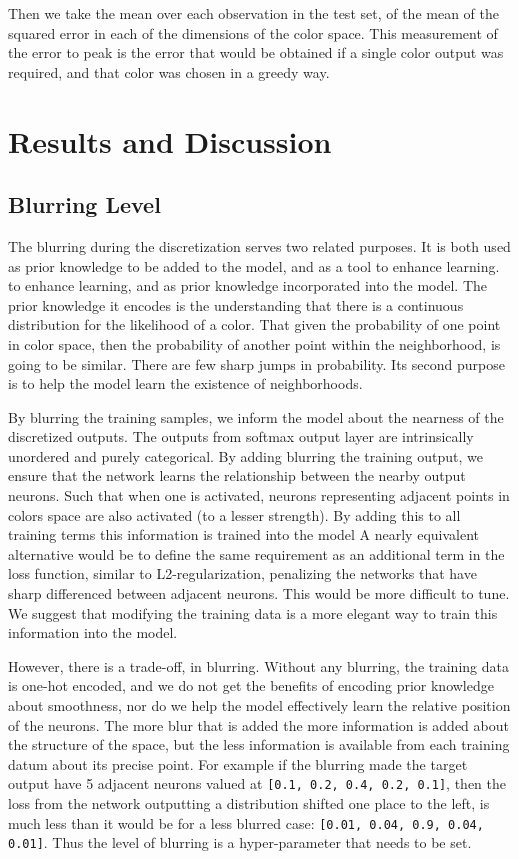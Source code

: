 \documentclass[11pt,letterpaper]{article}
\begin{document}
Then we take the mean over each observation in the test set, of the mean of the squared error in each of the dimensions of the color space.
This measurement of the error to peak is the error that would be obtained if a single color output was required, and that color was chosen in a greedy way.



\section{Results and Discussion}

\subsection{Blurring Level}
The blurring during the discretization serves two related purposes.
It is both used as prior knowledge to be added to the model, and as a tool to enhance learning.
to enhance learning, and as prior knowledge incorporated into the model. 
The prior knowledge it encodes is the understanding that there is a continuous distribution for the likelihood of a color.
That given the probability of one point in color space, then the probability of another point within the neighborhood, is going to be similar.
There are few sharp jumps in probability.
Its second purpose is to help the model learn the existence of neighborhoods.

By blurring the training samples, we inform the model about the nearness of the discretized outputs.
The outputs from softmax output layer are intrinsically unordered and purely categorical.
By adding blurring the training output, we ensure that the network learns the relationship between the nearby output neurons.
Such that when one is activated, neurons representing  adjacent points in colors space are also activated (to a lesser strength).
By adding this to all training terms this information is trained into the model
A nearly equivalent alternative would be to define the same requirement as an additional term in the loss function, similar to L2-regularization, penalizing the networks that have sharp differenced between adjacent neurons.
This would be more difficult to tune.
We suggest that modifying the training data is a more elegant way to train this information into the model.

However, there is a trade-off, in blurring.
Without any blurring, the training data is one-hot encoded, and we do not get the benefits of encoding prior knowledge about smoothness, nor do we help the model effectively learn the relative position of the neurons.
The more blur that is added the more information is added about the structure of the space,
but the less information is available from each training datum about its precise point.
For example if the blurring made the target output have 5 adjacent neurons valued at \texttt{[0.1, 0.2, 0.4, 0.2, 0.1]}, then the loss from the network outputting a distribution shifted one place to the left, is much less than it would be for a less blurred case: \texttt{[0.01, 0.04, 0.9, 0.04, 0.01]}.
Thus the level of blurring is a hyper-parameter that needs to be set.
\end{document}
